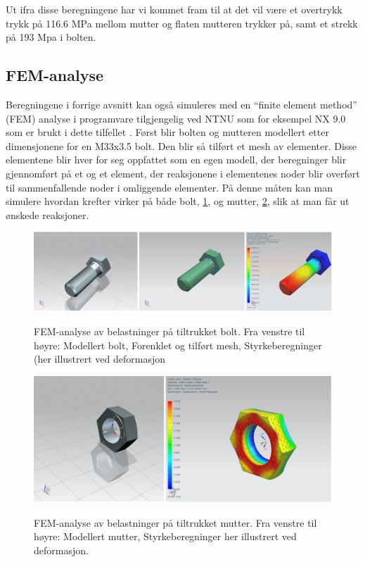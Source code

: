 Ut ifra disse beregningene har vi kommet fram til at det vil være et overtrykk trykk på 116.6 MPa mellom mutter og flaten mutteren trykker på, samt et strekk på 193 Mpa i bolten.

\subsection{FEM-analyse}

Beregningene i forrige avsnitt kan også simuleres med en ``finite element method'' (FEM) analyse i programvare tilgjengelig ved NTNU som for eksempel NX 9.0 som er brukt i dette tilfellet \cite{FEManalyse}. Først blir bolten og mutteren modellert etter dimensjonene for en M33x3.5 bolt. Den blir så tilført et mesh av elementer. Disse elementene blir hver for seg oppfattet som en egen modell, der beregninger blir gjennomført på et og et element, der reaksjonene i elementenes noder blir overført til sammenfallende noder i omliggende elementer. På denne måten kan man simulere hvordan krefter virker på både bolt, \ref{fig:FEMskrue}, og mutter, \ref{fig:FEMmutter}, slik at man får ut ønskede reaksjoner.

\begin{figure}[H]
		\centering
		\includegraphics[width=1.00\textwidth]{images/Rapportbilde_skrue.png}
		\label{fig:FEMskrue}
		\caption{FEM-analyse av belastninger på tiltrukket bolt. Fra venstre til høyre: Modellert bolt, Forenklet og tilført mesh, Styrkeberegninger (her illustrert ved deformasjon}
	\end{figure}
\begin{figure}[H]
		\centering
		\includegraphics[width=1.00\textwidth]{images/Rapportbilde_mutter.png}
		\label{fig:FEMmutter}
		\caption{FEM-analyse av belastninger på tiltrukket mutter. Fra venstre til høyre: Modellert mutter, Styrkeberegninger her illustrert ved deformasjon.}
	\end{figure}

 